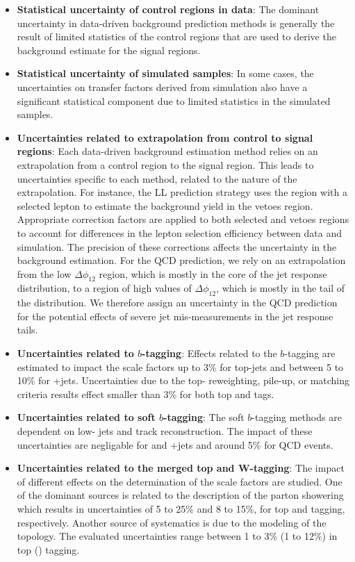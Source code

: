 \begin{itemize}
	\item \textbf{Statistical uncertainty of control regions in data}: The dominant uncertainty in data-driven background prediction methods is generally the result of limited statistics of the control regions that are used to derive the background estimate for the signal regions.
	\item \textbf{Statistical uncertainty of simulated samples}: In some cases, the uncertainties on transfer factors derived from simulation also have a significant statistical component due to limited statistics in the simulated samples.
	\item \textbf{Uncertainties related to extrapolation from control to signal regions}: Each data-driven background estimation method relies on an extrapolation from a control region to the signal region. This leads to uncertainties specific to each method, related to the nature of the extrapolation. For instance, the LL prediction strategy uses the region with a selected lepton to estimate the background yield in the vetoes region. Appropriate correction factors are applied to both selected and vetoes regions to account for differences in the lepton selection efficiency between data and simulation. The precision of these corrections affects the uncertainty in the background estimation. For the QCD prediction, we rely on an extrapolation from the low $\Delta\phi_{12}$ region, which is mostly in the core of the jet response distribution, to a region of high values of $\Delta\phi_{12}$, which is mostly in the tail of the distribution. We therefore assign an uncertainty in the QCD prediction for the potential effects of severe jet mis-measurements in the jet response tails. 
	\item \textbf{Uncertainties related to $b$-tagging}: Effects related to the $b$-tagging are estimated to impact the scale factors up to 3\% for top-jets and between 5 to 10\% for \W+jets. Uncertainties due to the top-\pt{} reweighting, pile-up, or matching criteria results effect smaller than 3\% for both top and \W{} tags. 
	\item \textbf{Uncertainties related to soft $b$-tagging}: The soft $b$-tagging methods are dependent on low-\pt{} jets and track reconstruction. The impact of these uncertainties are negligable for \ttbar{} and \W+jets and around 5\% for QCD events.
	\item \textbf{Uncertainties related to the merged top and W-tagging}: The impact of different effects on the determination of the scale factors are studied. One of the dominant sources is related to the description of the parton showering which results in uncertainties of 5 to 25\% and 8 to 15\%, for top and \W{} tagging, respectively. Another source of systematics is due to the modeling of the \ttbar{} topology. The evaluated uncertainties range between 1 to 3\% (1 to 12\%) in top (\W) tagging. 

\end{itemize}
